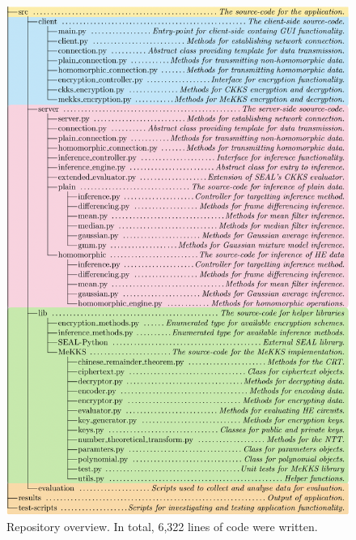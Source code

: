 \begin{figure}[h!]
    \includegraphics[scale=0.68]{figures/repositoryOverview}
    \caption[Repository Overview]{Repository overview. In total, 6,322 lines of code were written.}
    \label{fig:filetree}
\end{figure}
